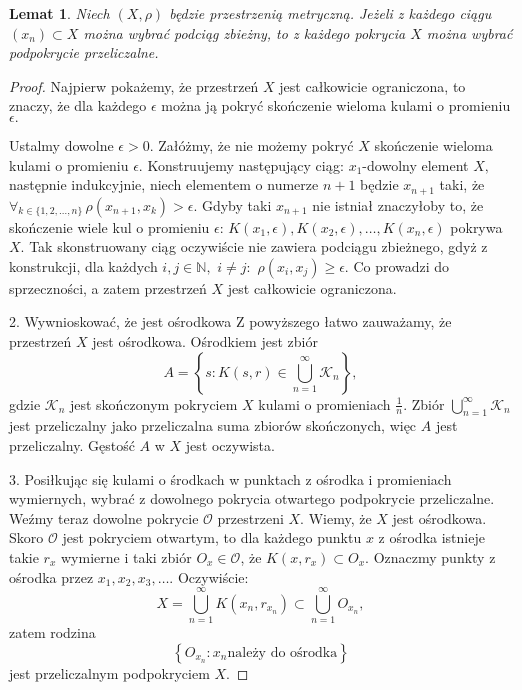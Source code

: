 \documentclass[licencjacka]{pwr_wmat_praca_dyplomowa}
\theoremstyle{plain}
\numberwithin{theorem}{chapter}
\newtheorem{lemma}[theorem]{Lemat}
\theoremstyle{definition}
\numberwithin{theorem}{chapter}
\begin{document}
{\color{red} 
\begin{lemma}
\label{z_kazdego_pokrycia_mozna_wybrac_podpokrycie_przeliczalne}
Niech $(X, \rho)$ będzie przestrzenią metryczną. Jeżeli z każdego ciągu $(x_n) \subset X$ można wybrać podciąg zbieżny, to z każdego pokrycia $X$ można wybrać podpokrycie przeliczalne.
\end{lemma}

\begin{proof}
Najpierw pokażemy, że przestrzeń $X$ jest całkowicie ograniczona, to znaczy, że  dla każdego $\epsilon$ można ją pokryć skończenie wieloma kulami o promieniu $\epsilon.$

Ustalmy dowolne $\epsilon > 0.$ Załóżmy, że nie możemy pokryć $X$ skończenie wieloma kulami o promieniu $\epsilon.$ 
Konstruujemy następujący ciąg: $x_1$-dowolny element $X,$ następnie indukcyjnie, niech elementem o numerze $n+1$ będzie $x_{n+1}$ taki, że $\forall_{k \in \{1,2, \ldots, n\}} \, \rho(x_{n+1}, x_k) > \epsilon.$ Gdyby taki $x_{n+1}$ nie istniał znaczyłoby to, że skończenie wiele kul o promieniu $\epsilon$: $K(x_1, \epsilon), K(x_2, \epsilon), \ldots, K(x_n, \epsilon)$ pokrywa $X.$ Tak skonstruowany ciąg oczywiście nie zawiera podciągu zbieżnego, gdyż z konstrukcji, dla każdych $i,j \in \mathbb{N}, $ $i \neq j: $ $\rho(x_i, x_j) \geq \epsilon.$ Co prowadzi do sprzeczności, a zatem przestrzeń $X$ jest całkowicie ograniczona.


{\color{blue}2. Wywnioskować, że jest ośrodkowa}
Z powyższego łatwo zauważamy, że przestrzeń $X$ jest ośrodkowa. Ośrodkiem jest zbiór 
$$A = \left\{ s : K(s, r) \in \bigcup_{n=1}^{\infty}\mathcal{K}_n \right\},$$
gdzie $\mathcal{K}_n$ jest skończonym pokryciem $X$ kulami o promieniach $\frac{1}{n}.$ Zbiór $\bigcup_{n=1}^{\infty}\mathcal{K}_n$ jest przeliczalny jako przeliczalna suma zbiorów skończonych, więc $A$ jest przeliczalny. Gęstość $A$ w $X$ jest oczywista.


{\color{blue}3. Posiłkując się kulami o środkach w punktach z ośrodka i promieniach wymiernych, wybrać z dowolnego pokrycia otwartego podpokrycie przeliczalne.}
Weźmy teraz dowolne pokrycie $\mathcal{O}$ przestrzeni $X.$ Wiemy, że $X$ jest ośrodkowa. Skoro $\mathcal{O}$ jest pokryciem otwartym, to dla każdego punktu $x$ z ośrodka istnieje takie $r_x$ wymierne i taki zbiór $O_x \in \mathcal{O}$, że $K(x,r_x) \subset O_x.$ Oznaczmy punkty z ośrodka przez $x_1, x_2, x_3, \ldots.$ Oczywiście:
$$X = \bigcup_{n=1}^{\infty}K(x_n, r_{x_n}) \subset \bigcup_{n=1}^{\infty}O_{x_n},$$
zatem rodzina 
$$\left\{O_{x_n} : x_n \textrm{należy do ośrodka} \right\}$$
jest przeliczalnym podpokryciem $X.$

\end{proof}
}
\end{document}
